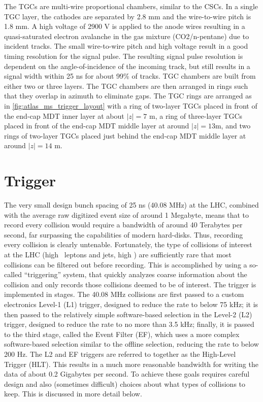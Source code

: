 The TGCs are multi-wire proportional chambers, similar to the CSCs.
In a single TGC layer, the cathodes are 
separated by 2.8 mm and the wire-to-wire pitch
is 1.8 mm.  A high voltage of 2900 V is applied to the anode wires
resulting in a quasi-saturated electron avalanche in the gas 
mixture (CO2/n-pentane) due to incident tracks.
The small wire-to-wire pitch and high voltage result in a good 
timing resolution for the signal pulse. The resulting
signal pulse resolution is dependent on the angle-of-incidence
of the incoming track, but still results in a signal width
within 25 ns for about 99\% of tracks.
TGC chambers are built from either two or three layers. 
The TGC chambers are then arranged in rings such that they overlap
in azimuth to eliminate gaps.
The TGC rings are arranged as in 
\fig\ref{fig:atlas_ms_trigger_layout}
with a ring of two-layer TGCs placed in front of the end-cap MDT inner
layer at about $|z|=7$ m, 
a ring of three-layer TGCs placed in front of the end-cap MDT
middle layer at around $|z|=13 $m, and two rings of 
two-layer TGCs placed just behind
the end-cap MDT middle layer at around $|z|=14$ m.



\section{Trigger}
\label{sec:atlas_trigger}

The very small design bunch spacing 
of 25 ns (40.08 MHz) at the LHC, combined with the average raw digitized event size
of around 1 Megabyte, means that to record every collision
would require a bandwidth of around 40 Terabytes per second, far surpassing
the capabilities of modern hard-disks. Thus, recording every collision
is clearly untenable. Fortunately, the type of collisions of interest at the LHC 
(high \pt~leptons and jets, high \met) are sufficiently rare 
that most collisions can be filtered out before recording. 
This is accomplished by using a so-called ``triggering'' system, 
that quickly analyzes coarse information about the collision
and only records those collisions deemed to be of interest.
The trigger is implemented in stages. The 40.08 MHz collisions are
first passed to a custom electronics Level-1 (L1) trigger, designed
to reduce the rate to below 75 kHz; it is then  passed to the 
relatively simple software-based selection in the 
Level-2 (L2) trigger, designed to reduce the rate
to no more than 3.5 kHz; finally, it is passed to the third stage,
called the Event Filter (EF), which uses a more complex software-based 
selection similar to the offline selection, reducing the 
rate to below 200 Hz. The L2 and EF triggers are referred to together
as the High-Level Trigger (HLT). This results in a much more reasonable 
bandwidth for writing the data of about 0.2 Gigabytes per second.
To achieve these goals requires careful design and also (sometimes difficult)
choices about what types of collisions to keep.  This is discussed in more
detail below. 


